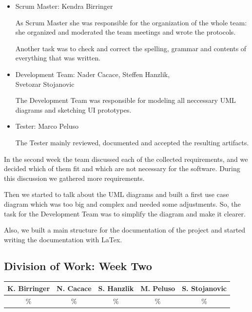 \documentclass[a4paper, 12pt]{article}
\begin{document}
\begin{itemize}
\item Scrum Master: Kendra Birringer

As Scrum Master she was responsible for the organization of the whole team: she organized and moderated the team meetings and wrote the protocols. 

Another task was to check and correct the spelling, grammar and contents of everything that was written.

\item Development Team: Nader Cacace, Steffen Hanzlik,\\
      Svetozar Stojanovic

The Development Team was responsible for modeling all neccessary UML diagrams and sketching UI prototypes.

\item Tester: Marco Peluso

The Tester mainly reviewed, documented and accepted the resulting artifacts.
\end{itemize}


In the second week the team discussed each of the collected requirements, and we decided which of them fit and which are not necessary for the software. During this discussion we gathered more requirements.

Then we started to talk about the UML diagrams and built a first use case diagram which was too big and complex and needed some adjustments. So, the task for the Development Team was to simplify the diagram and make it clearer.

Also, we built a main structure for the documentation of the project and started writing the documentation with LaTex. 

\newpage
\subsection{Division of Work: Week Two}

\begin{table}[h]
\centering
\setlength{\tabcolsep}{10pt}
\begin{tabular}{|c|c|c|c|c|}
\hline
K. Birringer & N. Cacace & S. Hanzlik & M. Peluso & S. Stojanovic\\
\hline
\% & \% & \% & \% & \% \\ 
\hline
\end{tabular}
\end{table}

\end{document}
